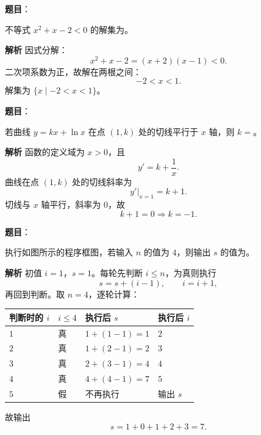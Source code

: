 \begin{answer}

\textbf{题目}：

不等式 $x^2+x-2<0$ 的解集为\gkblank{}。

\textbf{解析}
因式分解：
\nopagebreak[4]
\[x^2+x-2=(x+2)(x-1)<0.\]
二次项系数为正，故解在两根之间：
\nopagebreak[4]
\[-2<x<1.\]
解集为 $\{x\mid -2<x<1\}$。


\end{answer}
\begin{answer}

\textbf{题目}：

若曲线 $y=kx+\ln x$ 在点 $(1,k)$ 处的切线平行于 $x$ 轴，则 $k=$\gkblank{}。

\textbf{解析}
函数的定义域为 $x>0$，且
\nopagebreak[4]
\[y'=k+\frac1x.\]
曲线在点 $(1,k)$ 处的切线斜率为
\nopagebreak[4]
\[y'\big|_{x=1}=k+1.\]
切线与 $x$ 轴平行，斜率为 $0$，故
\nopagebreak[4]
\[k+1=0\Longrightarrow k=-1.\]


\end{answer}
\begin{answer}

\textbf{题目}：

执行如图所示的程序框图，若输入 $n$ 的值为 $4$，则输出 $s$ 的值为\gkblank{}。
\nopagebreak[4]
\begin{center}\end{center}
\nopagebreak[4]
\textbf{解析}
初值 $i=1$，$s=1$。每轮先判断 $i\leqslant n$，为真则执行
\nopagebreak[4]
\[s=s+(i-1),\qquad i=i+1,\]
再回到判断。取 $n=4$，逐轮计算：

\begin{center}
\begin{tabular}{llll}
\toprule
判断时的 $i$ & $i\leqslant4$ & 执行后 $s$ & 执行后 $i$ \\
\midrule
$1$ & 真 & $1+(1-1)=1$ & $2$ \\
$2$ & 真 & $1+(2-1)=2$ & $3$ \\
$3$ & 真 & $2+(3-1)=4$ & $4$ \\
$4$ & 真 & $4+(4-1)=7$ & $5$ \\
$5$ & 假 & 不再执行 & 输出 $s$ \\
\bottomrule
\end{tabular}
\end{center}

故输出
\nopagebreak[4]
\[s=1+0+1+2+3=7.\]


\end{answer}

